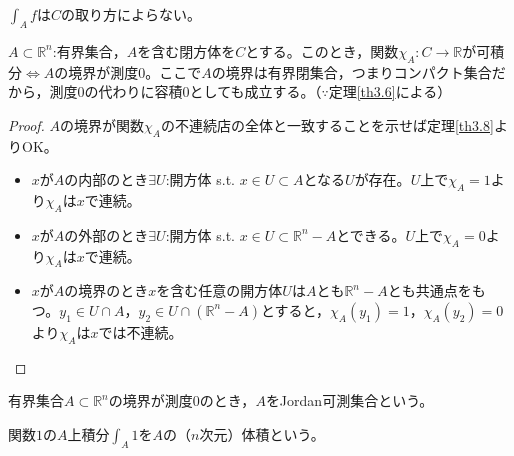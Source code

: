 \begin{note}
	$\displaystyle \int_A f$は$C$の取り方によらない。
\end{note}

\begin{framed}
	\begin{thm}
		$A\subset\mathbb{R}^n$:有界集合，$A$を含む閉方体を$C$とする。このとき，関数$\chi_A:C\to\mathbb{R}$が可積分$\Leftrightarrow$$A$の境界が測度$0$。ここで$A$の境界は有界閉集合，つまりコンパクト集合だから，測度$0$の代わりに容積$0$としても成立する。（$\because$定理\ref{th3.6}による）
	\end{thm}
\end{framed}

\begin{proof}
	$A$の境界が関数$\chi_A$の不連続店の全体と一致することを示せば定理\ref{th3.8}よりOK。
	\begin{itemize}
		\item $x$が$A$の内部のとき$\exists U$:開方体 s.t. $x\in U\subset A$となる$U$が存在。$U$上で$\chi_A=1$より$\chi_A$は$x$で連続。
		\item $x$が$A$の外部のとき$\exists U$:開方体 s.t. $x\in U\subset \mathbb{R}^n-A$とできる。$U$上で$\chi_A=0$より$\chi_A$は$x$で連続。
		\item $x$が$A$の境界のとき$x$を含む任意の開方体$U$は$A$とも$\mathbb{R}^n-A$とも共通点をもつ。$y_1\in U\cap A$，$y_2\in U\cap(\mathbb{R}^n-A)$とすると，$\chi_A(y_1)=1$，$\chi_A(y_2)=0$より$\chi_A$は$x$では不連続。
	\end{itemize}
\end{proof}

\begin{dfn*}[Jordan可測集合]
	有界集合$A\subset\mathbb{R}^n$の境界が測度$0$のとき，$A$をJordan可測集合という。
\end{dfn*}
\begin{dfn*}[体積]
	関数$1$の$A$上積分$\displaystyle \int_A 1$を$A$の（$n$次元）体積という。
\end{dfn*}
